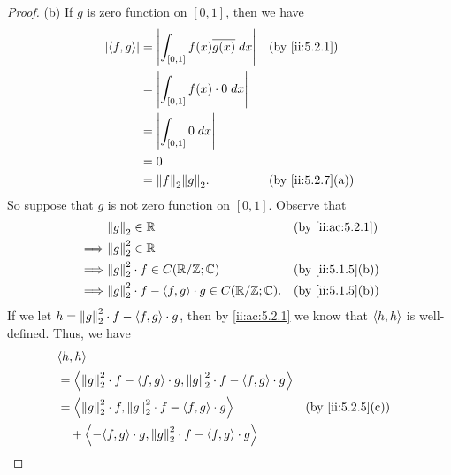 \begin{proof}{(b)}
  If \(g\) is zero function on \([0, 1]\), then we have
  \begin{align*}
    \abs{\inner*{f, g}} & = \abs{\int_{[0, 1]} f(x) \overline{g(x)} \; dx} &  & \by{ii:5.2.1}    \\
                        & = \abs{\int_{[0, 1]} f(x) \cdot 0 \; dx}                               \\
                        & = \abs{\int_{[0, 1]} 0 \; dx}                                          \\
                        & = 0                                                                    \\
                        & = \norm*{f}_2 \norm*{g}_2.                       &  & \by{ii:5.2.7}[a]
  \end{align*}
  So suppose that \(g\) is not zero function on \([0, 1]\).
  Observe that
  \begin{align*}
             & \norm*{g}_2 \in \R                                                 &  & \by{ii:ac:5.2.1} \\
    \implies & \norm*{g}_2^2 \in \R                                                                     \\
    \implies & \norm*{g}_2^2 \cdot f \in C(\R / \Z ; \C)                          &  & \by{ii:5.1.5}[b] \\
    \implies & \norm*{g}_2^2 \cdot f - \inner*{f, g} \cdot g \in C(\R / \Z ; \C). &  & \by{ii:5.1.5}[b]
  \end{align*}
  If we let \(h = \norm*{g}_2^2 \cdot f - \inner*{f, g} \cdot g\), then by \cref{ii:ac:5.2.1} we know that \(\inner*{h, h}\) is well-defined.
  Thus, we have
  \begin{align*}
     & \inner*{h, h}                                                                                                                                  \\
     & = \inner*{\norm*{g}_2^2 \cdot f - \inner*{f, g} \cdot g, \norm*{g}_2^2 \cdot f - \inner*{f, g} \cdot g}                                        \\
     & = \inner*{\norm*{g}_2^2 \cdot f, \norm*{g}_2^2 \cdot f - \inner*{f, g} \cdot g}                                          &  & \by{ii:5.2.5}[c] \\
     & \quad + \inner*{-\inner*{f, g} \cdot g, \norm*{g}_2^2 \cdot f - \inner*{f, g} \cdot g}                                                         \\

\end{align*}
\end{proof}
